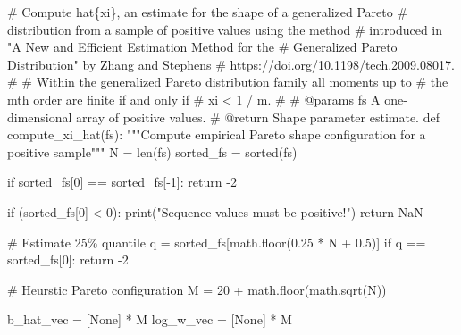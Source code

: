 \documentclass[
  letterpaper,
  DIV=11,
  numbers=noendperiod]{scrartcl}
\newenvironment{Shaded}{\begin{snugshade}}{\end{snugshade}}
\newcommand{\BuiltInTok}[1]{\textcolor[rgb]{0.00,0.23,0.31}{#1}}
\newcommand{\CommentTok}[1]{\textcolor[rgb]{0.37,0.37,0.37}{#1}}
\newcommand{\ControlFlowTok}[1]{\textcolor[rgb]{0.00,0.23,0.31}{#1}}
\newcommand{\DecValTok}[1]{\textcolor[rgb]{0.68,0.00,0.00}{#1}}
\newcommand{\FloatTok}[1]{\textcolor[rgb]{0.68,0.00,0.00}{#1}}
\newcommand{\KeywordTok}[1]{\textcolor[rgb]{0.00,0.23,0.31}{#1}}
\newcommand{\NormalTok}[1]{\textcolor[rgb]{0.00,0.23,0.31}{#1}}
\newcommand{\OperatorTok}[1]{\textcolor[rgb]{0.37,0.37,0.37}{#1}}
\newcommand{\StringTok}[1]{\textcolor[rgb]{0.13,0.47,0.30}{#1}}
\newcommand{\VariableTok}[1]{\textcolor[rgb]{0.07,0.07,0.07}{#1}}
\begin{document}
\begin{Shaded}
\begin{Highlighting}[]
\CommentTok{\# Compute hat\{xi\}, an estimate for the shape of a generalized Pareto }
\CommentTok{\# distribution from a sample of positive values using the method }
\CommentTok{\# introduced in "A New and Efficient Estimation Method for the }
\CommentTok{\# Generalized Pareto Distribution" by Zhang and Stephens }
\CommentTok{\# https://doi.org/10.1198/tech.2009.08017.}
\CommentTok{\# }
\CommentTok{\# Within the generalized Pareto distribution family all moments up to }
\CommentTok{\# the mth order are finite if and only if }
\CommentTok{\#  xi \textless{} 1 / m.}
\CommentTok{\#}
\CommentTok{\# @params fs A one{-}dimensional array of positive values.}
\CommentTok{\# @return Shape parameter estimate.}
\KeywordTok{def}\NormalTok{ compute\_xi\_hat(fs):}
  \CommentTok{"""Compute empirical Pareto shape configuration for a positive sample"""}
\NormalTok{  N }\OperatorTok{=} \BuiltInTok{len}\NormalTok{(fs)}
\NormalTok{  sorted\_fs }\OperatorTok{=} \BuiltInTok{sorted}\NormalTok{(fs)}
  
  \ControlFlowTok{if}\NormalTok{ sorted\_fs[}\DecValTok{0}\NormalTok{] }\OperatorTok{==}\NormalTok{ sorted\_fs[}\OperatorTok{{-}}\DecValTok{1}\NormalTok{]:}
    \ControlFlowTok{return} \OperatorTok{{-}}\DecValTok{2}
  
  \ControlFlowTok{if}\NormalTok{ (sorted\_fs[}\DecValTok{0}\NormalTok{] }\OperatorTok{\textless{}} \DecValTok{0}\NormalTok{):}
    \BuiltInTok{print}\NormalTok{(}\StringTok{"Sequence values must be positive!"}\NormalTok{)}
    \ControlFlowTok{return}\NormalTok{ NaN}
  
  \CommentTok{\# Estimate 25\% quantile}
\NormalTok{  q }\OperatorTok{=}\NormalTok{ sorted\_fs[math.floor(}\FloatTok{0.25} \OperatorTok{*}\NormalTok{ N }\OperatorTok{+} \FloatTok{0.5}\NormalTok{)]}
  \ControlFlowTok{if}\NormalTok{ q }\OperatorTok{==}\NormalTok{ sorted\_fs[}\DecValTok{0}\NormalTok{]:}
    \ControlFlowTok{return} \OperatorTok{{-}}\DecValTok{2}
    
  \CommentTok{\# Heurstic Pareto configuration}
\NormalTok{  M }\OperatorTok{=} \DecValTok{20} \OperatorTok{+}\NormalTok{ math.floor(math.sqrt(N))}
  
\NormalTok{  b\_hat\_vec }\OperatorTok{=}\NormalTok{ [}\VariableTok{None}\NormalTok{] }\OperatorTok{*}\NormalTok{ M}
\NormalTok{  log\_w\_vec }\OperatorTok{=}\NormalTok{ [}\VariableTok{None}\NormalTok{] }\OperatorTok{*}\NormalTok{ M}
  

\end{Highlighting}
\end{Shaded}
\end{document}
